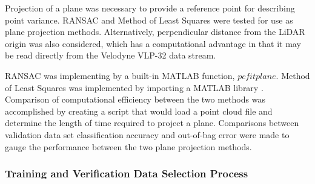\documentclass[numbered,pdftex]{ohio-etd}
\begin{document}
{{{{				{Projection of a plane was necessary to provide a reference point for describing point variance. RANSAC and Method of Least Squares were tested for use as plane projection methods. Alternatively, perpendicular distance from the LiDAR origin was also considered, which has a computational advantage in that it may be read directly from the Velodyne VLP-32 data stream.}
			
				{RANSAC was implementing by a built-in MATLAB function, $pcfitplane$. Method of Least Squares was implemented by importing a MATLAB library \cite{noauthor_object-oriented_nodate}. Comparison of computational efficiency between the two methods was accomplished by creating a script that would load a point cloud file and determine the length of time required to project a plane. Comparisons between validation data set classification accuracy and out-of-bag error were made to gauge the performance between the two plane projection methods.}
			
			} %
	
			\subsubsection{Training and Verification Data Selection Process}\label{sec:training_and_verification_data_selection_process}{
			
}}}}
\end{document}
